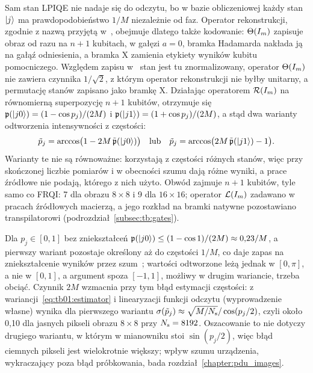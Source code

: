 Sam stan LPIQE nie nadaje się do odczytu, bo w bazie obliczeniowej każdy stan $\ket{j}$ ma prawdopodobieństwo $1/M$ niezależnie od faz.
Operator rekonstrukcji, zgodnie z nazwą przyjętą w~\cite{werner_error_reduction_2025}, obejmuje dlatego także kodowanie: $\Theta(I_m)$ zapisuje obraz od razu na $n+1$ kubitach, w gałęzi $a=0$, bramka Hadamarda nakłada ją na gałąź odniesienia, a bramka $\mathrm{X}$ zamienia etykiety wyników kubitu pomocniczego.
Względem zapisu w~\cite{werner_data_loss_2023,werner_error_reduction_2025} stan jest tu znormalizowany, operator $\Theta(I_m)$ nie zawiera czynnika $1/\sqrt{2}$, z którym operator rekonstrukcji nie byłby unitarny, a permutację stanów zapisano jako bramkę $\mathrm{X}$.
Działając operatorem $\mathcal{R}(I_m)$ na równomierną superpozycję $n+1$ kubitów, otrzymuje się $\mathfrak{p}(\ket{j0})=(1-\cos p_j)/(2M)$ i $\mathfrak{p}(\ket{j1})=(1+\cos p_j)/(2M)$, a stąd dwa warianty odtworzenia intensywności z częstości:
\begin{equation}\label{eq:tb:qimg:lpiqe-pixel}
\tilde{p}_j=\arccos\bigl(1-2M\,\tilde{\mathfrak{p}}(\ket{j0})\bigr)
\quad\text{lub}\quad
\tilde{p}_j=\arccos\bigl(2M\,\tilde{\mathfrak{p}}(\ket{j1})-1\bigr).
\end{equation}
Warianty te nie są równoważne: korzystają z częstości różnych stanów, więc przy skończonej liczbie pomiarów i w obecności szumu dają różne wyniki, a prace źródłowe nie podają, którego z nich użyto.
Obwód zajmuje $n+1$ kubitów, tyle samo co FRQI: 7 dla obrazu $8\times8$ i 9 dla $16\times16$; operator $\mathcal{L}(I_m)$ zadawano w pracach źródłowych macierzą, a jego rozkład na bramki natywne pozostawiano transpilatorowi (podrozdział~\ref{subsec:tb:gates}).

Dla $p_j\in[0,1]$ bez zniekształceń $\mathfrak{p}(\ket{j0})\le(1-\cos1)/(2M)\approx0{,}23/M$, a pierwszy wariant pozostaje określony aż do częstości $1/M$, co daje zapas na zniekształcenie wyników przez szum~\cite{werner_error_reduction_2025}; wartości odtworzone leżą jednak w $[0,\pi]$, a nie w $[0,1]$, a argument spoza $[-1,1]$, możliwy w drugim wariancie, trzeba obciąć.
Czynnik $2M$ wzmacnia przy tym błąd estymacji częstości: z wariancji~\eqref{eq:tb01:estimator} i linearyzacji funkcji odczytu (wyprowadzenie własne) wynika dla pierwszego wariantu $\sigma(\tilde{p}_j)\approx\sqrt{M/N_{\mathrm{s}}}/\cos(p_j/2)$, czyli około 0,10 dla jasnych pikseli obrazu $8\times8$ przy $N_{\mathrm{s}}=8192$.
Oszacowanie to nie dotyczy drugiego wariantu, w którym w mianowniku stoi $\sin(p_j/2)$, więc błąd ciemnych pikseli jest wielokrotnie większy; wpływ szumu urządzenia, wykraczający poza błąd próbkowania, bada rozdział~\ref{chapter:pdu_images}.

